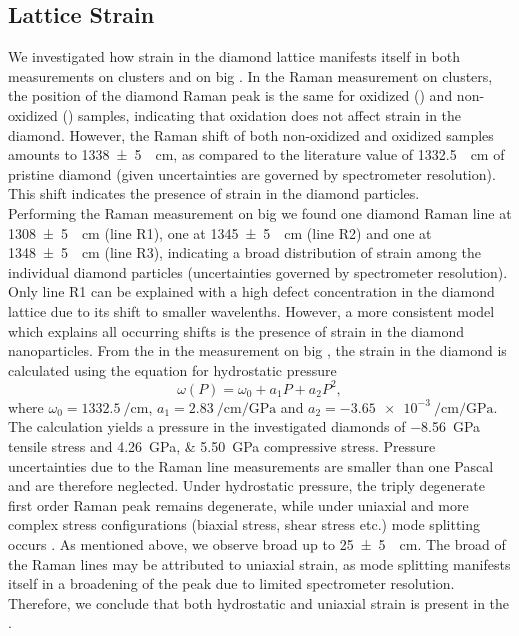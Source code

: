 			\subsection{Lattice Strain}\label{subsection::raman_strain}

				We investigated how strain in the diamond lattice manifests itself in both measurements on \nd clusters and on big \nds.
				In the Raman measurement on \nd clusters, the position of the diamond Raman peak is the same for oxidized (\insituSo) and non-oxidized (\insituSn) samples, indicating that oxidation does not affect strain in the diamond.
				However, the Raman shift of both non-oxidized and oxidized samples amounts to \SI[separate-uncertainty]{1338+-5}{\per\centi\meter}, as compared to the literature value of \SI{1332.5}{\per\centi\meter} of pristine diamond \cite{Zaitsev2001} (given uncertainties are governed by spectrometer resolution).
				This shift indicates the presence of strain in the diamond particles.
				\\
				Performing the Raman measurement on big \nds we found one diamond Raman line at \SI[separate-uncertainty]{1308+-5}{\per\centi\meter} (line R1), one at \SI[separate-uncertainty]{1345+-5}{\per\centi\meter} (line R2) and one at \SI[separate-uncertainty]{1348+-5}{\per\centi\meter} (line R3), indicating a broad distribution of strain among the individual diamond particles (uncertainties governed by spectrometer resolution).
				Only line R1 can be explained with a high defect concentration in the diamond lattice due to its shift to smaller wavelenths.
				However, a more consistent model which explains all occurring shifts is the presence of strain in the diamond nanoparticles.
				From the \lws in the measurement on big \nds, the strain in the diamond is calculated using the equation for hydrostatic pressure \cite{Prawer2004}
				\begin{equation}
					\omega(P)=\omega_0+a_1P+a_2P^2,
				\end{equation}
				where $\omega_0=\SI{1332.5}{\per\centi\meter}$, $a_1=\SI{2.83}{\per\centi\meter\per\giga\pascal}$ and $a_2=\SI{-3.65e-3}{\per\centi\meter\per\giga\pascal}$.
				The calculation yields a pressure in the investigated diamonds of \SI{-8.56}{\giga\pascal} tensile stress and \SIlist{4.26;5.50}{\giga\pascal} compressive stress.
				Pressure uncertainties due to the Raman line measurements are smaller than one Pascal and are therefore neglected.
				Under hydrostatic pressure, the triply degenerate first order Raman peak remains degenerate, while under uniaxial and more complex stress configurations (biaxial stress, shear stress etc.) mode splitting occurs \cite{Prawer2004}.
				As mentioned above, we observe broad \lws up to \SI[separate-uncertainty]{25+-5}{\per\centi\meter}.
				The broad \lws of the Raman lines may be attributed to uniaxial strain, as mode splitting manifests itself in a broadening of the peak due to limited spectrometer resolution.
				Therefore, we conclude that both hydrostatic and uniaxial strain is present in the \nds.

